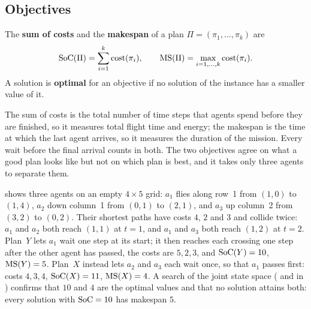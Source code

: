 \subsection{Objectives}
\label{sec:ch07-objectives}

\begin{definition}
\label{def:ch07-objectives}
The \textbf{sum of costs}
and the \textbf{makespan} of a plan
$\Pi = (\pi_1, \dots, \pi_k)$ are
\begin{equation}
  \mathrm{SoC}(\Pi) = \sum_{i=1}^{k} \operatorname{cost}(\pi_i),
  \qquad
  \mathrm{MS}(\Pi) = \max_{i=1,\dots,k} \operatorname{cost}(\pi_i).
  \label{eq:ch07-objectives}
\end{equation}
A solution is \textbf{optimal} for an objective
if no solution of the instance has a smaller value of it.
\end{definition}

The sum of costs is the total number of time steps that agents spend before
they are finished, so it measures total flight time and energy; the makespan
is the time at which the last agent arrives, so it measures the duration of
the mission. Every wait before the final arrival counts in both. The two
objectives agree on what a good plan looks like but not on which plan is
best, and it takes only three agents to separate them.

\begin{example}
\label{ex:ch07-disagree}
 shows three agents on an empty
$4 \times 5$ grid: $a_1$ flies along row~1 from $(1,0)$ to $(1,4)$, $a_2$ down
column~1 from $(0,1)$ to $(2,1)$, and $a_3$ up column~2 from $(3,2)$ to
$(0,2)$. Their shortest paths have costs $4$, $2$ and $3$ and collide twice:
$a_1$ and $a_2$ both reach $(1,1)$ at $t=1$, and $a_1$ and $a_3$ both reach
$(1,2)$ at $t=2$. Plan~$Y$ lets $a_1$ wait one step at its start; it then
reaches each crossing one step after the other agent has passed, the costs
are $5, 2, 3$, and $\mathrm{SoC}(Y) = 10$, $\mathrm{MS}(Y) = 5$. Plan~$X$ instead
lets $a_2$ and $a_3$ each wait once, so that $a_1$ passes first: costs
$4, 3, 4$, $\mathrm{SoC}(X) = 11$, $\mathrm{MS}(X) = 4$. A search of the joint
state space ( and
 in ) confirms that
$10$ and $4$ are the optimal values and that no solution attains both: every
solution with $\mathrm{SoC} = 10$ has makespan $5$.
\end{example}

